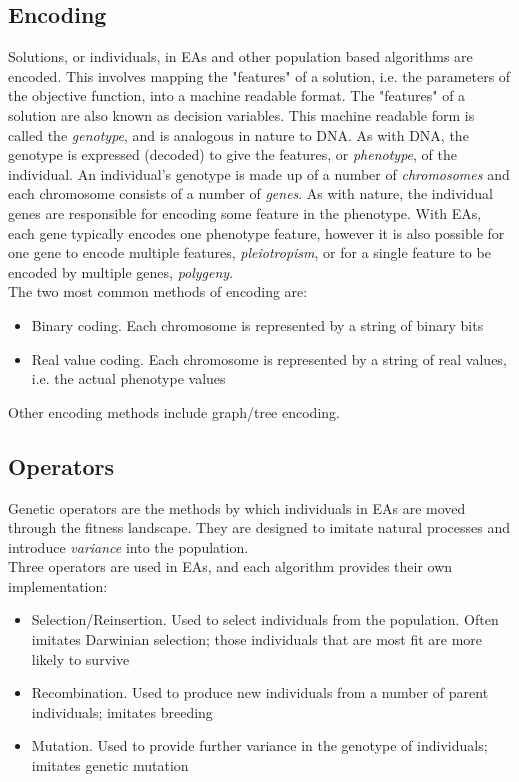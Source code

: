 \subsection{Encoding}
\label{sec:encoding}
Solutions, or individuals, in EAs and other population based algorithms are encoded. This involves mapping the "features" of a solution, i.e. the parameters of the objective function, into a machine readable format. The "features" of a solution are also known as decision variables. This machine readable form is called the \emph{genotype}, and is analogous in nature to DNA. As with DNA, the genotype is expressed (decoded) to give the features, or \emph{phenotype}, of the individual. An individual's genotype is made up of a number of \emph{chromosomes} and each chromosome consists of a number of \emph{genes}. As with nature, the individual genes are responsible for encoding some feature in the phenotype. With EAs, each gene typically encodes one phenotype feature, however it is also possible for one gene to encode multiple features, \emph{pleiotropism}, or for a single feature to be encoded by multiple genes, \emph{polygeny}.
\\The two most common methods of encoding are:
\begin{itemize}
  \item{Binary coding. Each chromosome is represented by a string of binary bits}
  \item{Real value coding. Each chromosome is represented by a string of real values, i.e. the actual phenotype values}
\end{itemize}
Other encoding methods include graph/tree encoding.

\subsection{Operators}
Genetic operators are the methods by which individuals in EAs are moved through the fitness landscape. They are designed to imitate natural processes and introduce \emph{variance} into the population.
\\Three operators are used in EAs, and each algorithm provides their own implementation:
\begin{itemize}
  \item{Selection/Reinsertion. Used to select individuals from the population. Often imitates Darwinian selection; those individuals that are most fit are more likely to survive}
  \item{Recombination. Used to produce new individuals from a number of parent individuals; imitates breeding}
  \item{Mutation. Used to provide further variance in the genotype of individuals; imitates genetic mutation}
\end{itemize}

